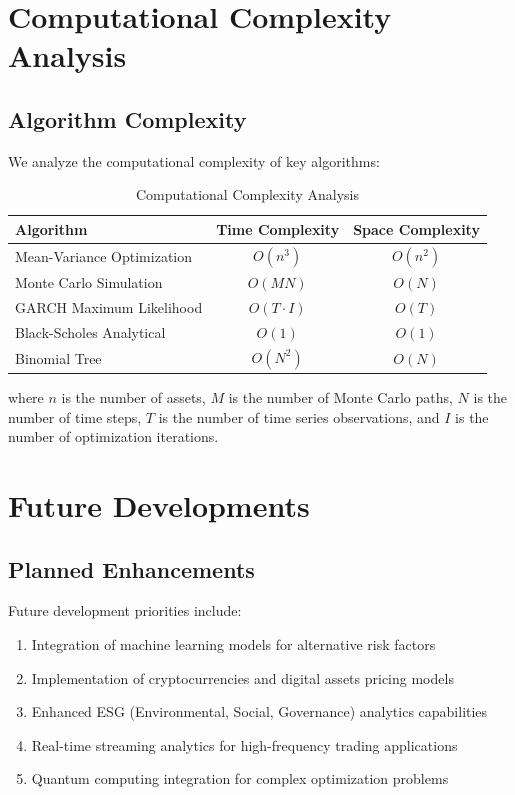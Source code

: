 \documentclass[12pt,a4paper]{article}
\theoremstyle{definition}
\theoremstyle{remark}
\begin{document}
\section{Computational Complexity Analysis}

\subsection{Algorithm Complexity}

We analyze the computational complexity of key algorithms:

\begin{table}[H]
\centering
\caption{Computational Complexity Analysis}
\begin{tabular}{@{}lcc@{}}
\toprule
Algorithm & Time Complexity & Space Complexity \\
\midrule
Mean-Variance Optimization & $O(n^3)$ & $O(n^2)$ \\
Monte Carlo Simulation & $O(MN)$ & $O(N)$ \\
GARCH Maximum Likelihood & $O(T \cdot I)$ & $O(T)$ \\
Black-Scholes Analytical & $O(1)$ & $O(1)$ \\
Binomial Tree & $O(N^2)$ & $O(N)$ \\
\bottomrule
\end{tabular}
\end{table}

where $n$ is the number of assets, $M$ is the number of Monte Carlo paths, $N$ is the number of time steps, $T$ is the number of time series observations, and $I$ is the number of optimization iterations.

\section{Future Developments}

\subsection{Planned Enhancements}

Future development priorities include:

\begin{enumerate}
    \item Integration of machine learning models for alternative risk factors
    \item Implementation of cryptocurrencies and digital assets pricing models
    \item Enhanced ESG (Environmental, Social, Governance) analytics capabilities
    \item Real-time streaming analytics for high-frequency trading applications
    \item Quantum computing integration for complex optimization problems
\end{enumerate}
\end{document}
